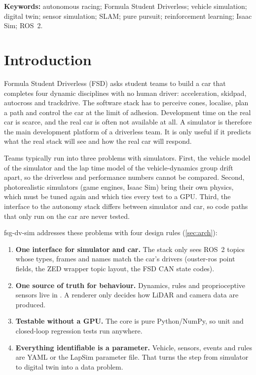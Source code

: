 \documentclass[11pt]{article}
\begin{document}
\noindent\textbf{Keywords:} autonomous racing; Formula Student Driverless; vehicle simulation; digital twin; sensor
simulation; SLAM; pure pursuit; reinforcement learning; Isaac Sim; ROS~2.

\tableofcontents
\newpage

\section{Introduction}
Formula Student Driverless (FSD) asks student teams to build a car that completes four dynamic disciplines with no
human driver: acceleration, skidpad, autocross and trackdrive. The software stack has to perceive cones, localise,
plan a path and control the car at the limit of adhesion. Development time on the real car is scarce, and the real
car is often not available at all. A simulator is therefore the main development platform of a driverless team.
It is only useful if it predicts what the real stack will see and how the real car will respond.

Teams typically run into three problems with simulators. First, the vehicle model of the simulator and the lap time
model of the vehicle-dynamics group drift apart, so the driverless and performance numbers cannot be compared.
Second, photorealistic simulators (game engines, Isaac Sim) bring their own physics, which must be tuned again and
which ties every test to a GPU. Third, the interface to the autonomy stack differs between simulator and car, so
code paths that only run on the car are never tested.

fsg-dv-sim addresses these problems with four design rules (\cref{sec:arch}):
\begin{enumerate}
  \item \textbf{One interface for simulator and car.} The stack only sees ROS~2 topics whose types, frames and
        names match the car's drivers (ouster-ros point fields, the ZED wrapper topic layout, the FSD CAN state
        codes).
  \item \textbf{One source of truth for behaviour.} Dynamics, rules and proprioceptive sensors live in
        . A renderer only decides how LiDAR and camera data are produced.
  \item \textbf{Testable without a GPU.} The core is pure Python/NumPy, so unit and closed-loop regression tests
        run anywhere.
  \item \textbf{Everything identifiable is a parameter.} Vehicle, sensors, events and rules are YAML or the LapSim
        parameter file. That turns the step from simulator to digital twin into a data problem.
\end{enumerate}
\end{document}
